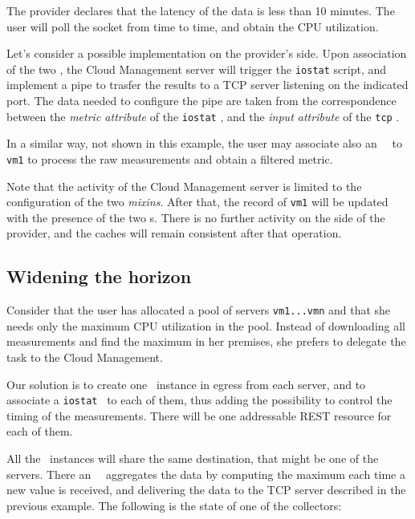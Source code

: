 \documentclass[12pt]{article}  %
\begin{document}
The provider declares that the latency of the data is less than 10 minutes. The user will poll the socket from time to time, and obtain the CPU utilization.

Let's consider a possible implementation on the provider's side. Upon association of the two \mi , the Cloud Management server will trigger the {\tt \small iostat} script, and implement a pipe to trasfer the results to a TCP server listening on the indicated port. The data needed to configure the pipe are taken from the correspondence between the {\em metric attribute} of the {\tt \small iostat} \mi , and the {\em input attribute} of the {\tt \small tcp} \mi .

In a similar way, not shown in this example, the user may associate also an \aggr\ \mi\ to {\tt \small vm1} to process the raw measurements and obtain a filtered metric.

Note that the activity of the Cloud Management server is limited to the configuration of the two {\em mixins}. After that, the record of {\tt \small vm1} will be updated with the presence of the two \mi s. There is no further activity on the side of the provider, and the caches will remain consistent after that operation.

\subsection*{Widening the horizon}

Consider that the user has allocated a pool of servers {\tt \small vm1...vmn} and that she needs only the maximum CPU utilization in the pool. Instead of downloading all measurements and find the maximum in her premises, she prefers to delegate the task to the Cloud Management.

Our solution is to create one \coll\ instance in egress from each server, and to associate a {\tt \small iostat} \mi\ to each of them, thus adding the possibility to control the timing of the measurements. There will be one addressable REST resource for each of them.

All the \coll\ instances will share the same destination, that might be one of the servers. There an \aggr\ \mi\ aggregates the data by computing the maximum each time a new value is received, and delivering the data to the TCP server described in the previous example. The following is the state of one of the collectors:
\end{document}
